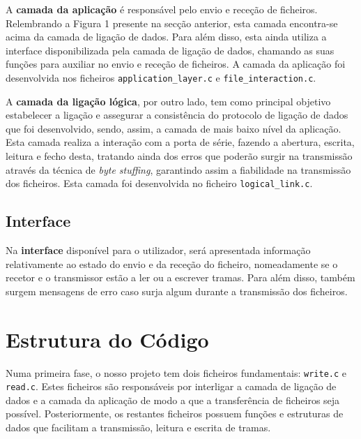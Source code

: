 \documentclass[article, a4paper, 11pt, oneside]{memoir}
\begin{document}
A \textbf{camada da aplicação} é responsável pelo envio e receção de ficheiros. Relembrando
a Figura 1 presente na secção anterior, esta camada encontra-se acima da camada de ligação de
dados. Para além disso, esta ainda utiliza a interface disponibilizada pela camada de ligação
de dados, chamando as suas funções para auxiliar no envio e receção de ficheiros. A camada da aplicação 
foi desenvolvida nos ficheiros \verb|application_layer.c| e \verb|file_interaction.c|.

A \textbf{camada da ligação lógica}, por outro lado, tem como principal objetivo estabelecer
a ligação e assegurar a consistência do protocolo de ligação de dados que foi desenvolvido, sendo,
assim, a camada de mais baixo nível da aplicação. Esta camada realiza a interação com a porta de
série, fazendo a abertura, escrita, leitura e fecho desta, tratando ainda dos erros que poderão
surgir na transmissão através da técnica de \textit{byte stuffing}, garantindo assim a fiabilidade
na transmissão dos ficheiros. Esta camada foi desenvolvida no ficheiro \verb|logical_link.c|.

\section{Interface}

Na \textbf{interface} disponível para o utilizador, será apresentada informação relativamente
ao estado do envio e da receção do ficheiro, nomeadamente se o recetor e o transmissor estão
a ler ou a escrever tramas. Para além disso, também surgem mensagens de erro caso surja algum
durante a transmissão dos ficheiros.

\chapter[Estrutura do Código][Estrutura do Código]{Estrutura do Código} \label{\thechapter}

Numa primeira fase, o nosso projeto tem dois ficheiros fundamentais: \verb|write.c| e \verb|read.c|.
Estes ficheiros são responsáveis por interligar a camada de ligação de dados e a camada da
aplicação de modo a que a transferência de ficheiros seja possível. Posteriormente,
os restantes ficheiros possuem funções e estruturas de dados que facilitam a transmissão, leitura
e escrita de tramas.
\end{document}
